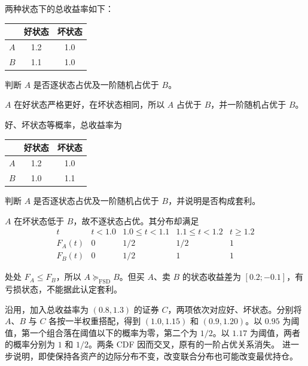 \begin{tcolorbox}[example]
\begin{question}
 两种状态下的总收益率如下：
\begin{center}
\begin{tabular}{c|cc}
 &好状态&坏状态\\\hline
 $A$&1.2&1.0\\
 $B$&1.1&1.0
\end{tabular}
\end{center}
判断 $A$ 是否逐状态占优及一阶随机占优于 $B$。
\end{question}
\begin{solution}[blank-type=manual,blank-vsep=3\baselineskip]
$A$ 在好状态严格更好，在坏状态相同，所以 $A$ 占优于 $B$，并一阶随机占优于 $B$。
\end{solution}
\end{tcolorbox}

\begin{tcolorbox}[example]
\begin{question}
 好、坏状态等概率，总收益率为
\begin{center}
\begin{tabular}{c|cc}
 &好状态&坏状态\\\hline
 $A$&1.2&1.0\\
 $B$&1.0&1.1
\end{tabular}
\end{center}
判断 $A$ 是否逐状态占优及一阶随机占优于 $B$，并说明是否构成套利。
\end{question}
\begin{solution}[blank-type=manual,blank-vsep=3\baselineskip]
$A$ 在坏状态低于 $B$，故不逐状态占优。其分布却满足
\[
\begin{array}{c|cccc}
 t&t<1.0&1.0\le t<1.1&1.1\le t<1.2&t\ge1.2\\\hline
 F_A(t)&0&1/2&1/2&1\\
 F_B(t)&0&1/2&1&1
\end{array}
\]

处处 $F_A\le F_B$，所以 $A\succeq_{\mathrm{FSD}}B$。但买 $A$、卖 $B$ 的状态收益差为 $[0.2;-0.1]$，有亏损状态，不能据此认定套利。
\end{solution}
\end{tcolorbox}

沿用，加入总收益率为 $(0.8,1.3)$ 的证券 $C$，两项依次对应好、坏状态。分别将 $A$、$B$ 与 $C$ 各按一半权重搭配，得到 $(1.0,1.15)$ 和 $(0.9,1.20)$。以 $0.95$ 为阈值，第一个组合落在阈值以下的概率为零，第二个为 $1/2$。以 $1.17$ 为阈值，两者的概率分别为 $1$ 和 $1/2$。两条 CDF 因而交叉，原有的一阶占优关系消失。 进一步说明，即使保持各资产的边际分布不变，改变联合分布也可能改变最优持仓。


